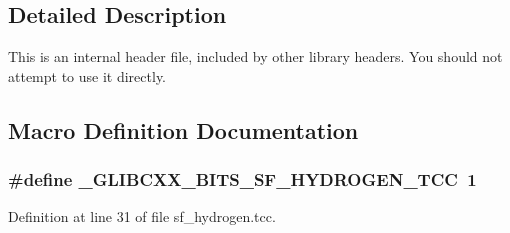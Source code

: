 \subsection{Detailed Description}
This is an internal header file, included by other library headers. You should not attempt to use it directly. 

\subsection{Macro Definition Documentation}
\subsubsection[{\texorpdfstring{\+\_\+\+G\+L\+I\+B\+C\+X\+X\+\_\+\+B\+I\+T\+S\+\_\+\+S\+F\+\_\+\+H\+Y\+D\+R\+O\+G\+E\+N\+\_\+\+T\+CC}{_GLIBCXX_BITS_SF_HYDROGEN_TCC}}]{\setlength{\rightskip}{0pt plus 5cm}\#define \+\_\+\+G\+L\+I\+B\+C\+X\+X\+\_\+\+B\+I\+T\+S\+\_\+\+S\+F\+\_\+\+H\+Y\+D\+R\+O\+G\+E\+N\+\_\+\+T\+CC~1}\hypertarget{sf__hydrogen_8tcc_af6b60d2402ae885b7f3ef4519fb65ed9}{}\label{sf__hydrogen_8tcc_af6b60d2402ae885b7f3ef4519fb65ed9}


Definition at line 31 of file sf\+\_\+hydrogen.\+tcc.

